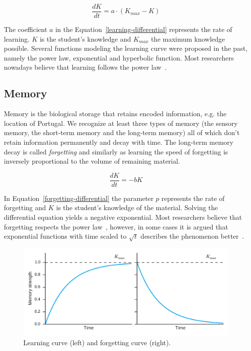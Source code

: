 \begin{equation} \label{learning-differential}
  \frac{dK}{dt} = a \cdot (K_{max} - K)
\end{equation}

The coefficient $a$ in the Equation~\ref{learning-differential} represents the rate of learning. $K$ is the student's knowledge and $K_{max}$ the maximum knowledge possible. Several functions modeling the learning curve were proposed in the past, namely the power law, exponential and hyperbolic function. Most researchers nowadays believe that learning follows the power law~\cite{Klusasek2014}.

\subsection{Memory}
\label{memory}

Memory is the biological storage that retains encoded information, e.g. the location of Portugal. We recognize at least three types of memory (the sensory memory, the short-term memory and the long-term memory) all of which don't retain information permanently and decay with time. The long-term memory decay is called \textit{forgetting} and similarly as learning the speed of forgetting is inversely proportional to the volume of remaining material.

\begin{equation} \label{forgetting-differential}
  \frac{dK}{dt} = -bK
\end{equation}

In Equation~\ref{forgetting-differential} the parameter $p$ represents the rate of forgetting and $K$ is the student's knowledge of the material. Solving the differential equation yields a negative exponential. Most researchers believe that forgetting respects the power law~\cite{MichaelW.Eysenck2008}, however, in some cases it is argued that exponential functions with time scaled to $\sqrt{t}$ describes the phenomenon better~\cite{White2001}.

\begin{figure}[htbp]
  \centering
  \includegraphics[width=\textwidth]{img/learning-forgetting-curves}
  \caption{Learning curve (left) and forgetting curve (right).}
  \label{fig:learning-forgetting-curves}
\end{figure}

